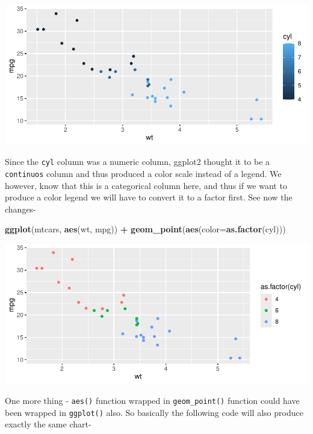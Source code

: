 \documentclass[
]{book}
\newenvironment{Shaded}{\begin{snugshade}}{\end{snugshade}}
\newcommand{\AttributeTok}[1]{\textcolor[rgb]{0.13,0.29,0.53}{#1}}
\newcommand{\FunctionTok}[1]{\textcolor[rgb]{0.13,0.29,0.53}{\textbf{#1}}}
\newcommand{\NormalTok}[1]{#1}
\newcommand{\SpecialCharTok}[1]{\textcolor[rgb]{0.81,0.36,0.00}{\textbf{#1}}}
\begin{document}
\begin{center}\includegraphics{DauR_files/figure-latex/fig_6-1} \end{center}

Since the \texttt{cyl} column was a numeric column, ggplot2 thought it to be a \texttt{continuos} column and thus produced a color scale instead of a legend. We however, know that this is a categorical column here, and thus if we want to produce a color legend we will have to convert it to a factor first. See now the changes-

\begin{Shaded}
\begin{Highlighting}[]
\FunctionTok{ggplot}\NormalTok{(mtcars, }\FunctionTok{aes}\NormalTok{(wt, mpg)) }\SpecialCharTok{+}
  \FunctionTok{geom\_point}\NormalTok{(}\FunctionTok{aes}\NormalTok{(}\AttributeTok{color=}\FunctionTok{as.factor}\NormalTok{(cyl)))}
\end{Highlighting}
\end{Shaded}

\begin{center}\includegraphics{DauR_files/figure-latex/fig_7-1} \end{center}

One more thing - \texttt{aes()} function wrapped in \texttt{geom\_point()} function could have been wrapped in \texttt{ggplot()} also. So basically the following code will also produce exactly the same chart-
\end{document}
